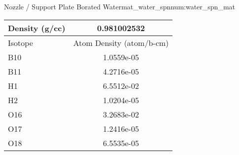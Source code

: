\begin{matitem}{Nozzle / Support Plate Borated Water}{mat_water_spn}{num:water_spn_mat}
  \centering
  \begin{tabular}{l c}
    \toprule
    Density (g/cc) & 0.981002532 \\
    \midrule
    Isotope & Atom Density (atom/b-cm) \\
    \midrule
    \midrule
B10 & 1.0559e-05 \\
B11 & 4.2716e-05 \\
H1 & 6.5512e-02 \\
H2 & 1.0204e-05 \\
O16 & 3.2683e-02 \\
O17 & 1.2416e-05 \\
O18 & 6.5535e-05 \\

    \bottomrule
  \end{tabular}
\end{matitem}
